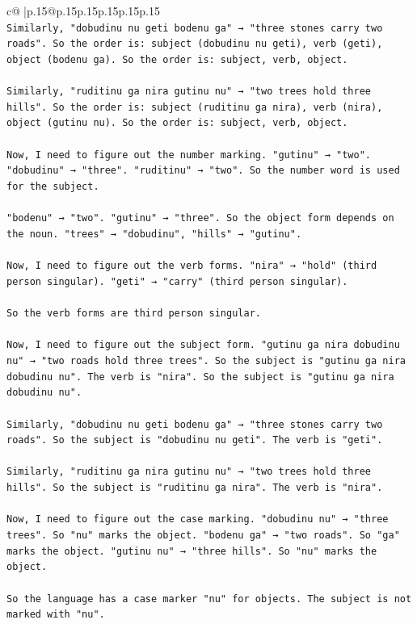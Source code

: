 \documentclass{article}
\begin{document}
{\begin{supertabular}{c@{$\;$}|p{.15\linewidth}@{}p{.15\linewidth}p{.15\linewidth}p{.15\linewidth}p{.15\linewidth}p{.15\linewidth}}
{{{\\ 
\texttt{Similarly, "dobudinu nu geti bodenu ga" → "three stones carry two roads". So the order is: subject (dobudinu nu geti), verb (geti), object (bodenu ga). So the order is: subject, verb, object.} \\
\\ 
\texttt{Similarly, "ruditinu ga nira gutinu nu" → "two trees hold three hills". So the order is: subject (ruditinu ga nira), verb (nira), object (gutinu nu). So the order is: subject, verb, object.} \\
\\ 
\texttt{Now, I need to figure out the number marking. "gutinu" → "two". "dobudinu" → "three". "ruditinu" → "two". So the number word is used for the subject.} \\
\\ 
\texttt{"bodenu" → "two". "gutinu" → "three". So the object form depends on the noun. "trees" → "dobudinu", "hills" → "gutinu".} \\
\\ 
\texttt{Now, I need to figure out the verb forms. "nira" → "hold" (third person singular). "geti" → "carry" (third person singular).} \\
\\ 
\texttt{So the verb forms are third person singular.} \\
\\ 
\texttt{Now, I need to figure out the subject form. "gutinu ga nira dobudinu nu" → "two roads hold three trees". So the subject is "gutinu ga nira dobudinu nu". The verb is "nira". So the subject is "gutinu ga nira dobudinu nu".} \\
\\ 
\texttt{Similarly, "dobudinu nu geti bodenu ga" → "three stones carry two roads". So the subject is "dobudinu nu geti". The verb is "geti".} \\
\\ 
\texttt{Similarly, "ruditinu ga nira gutinu nu" → "two trees hold three hills". So the subject is "ruditinu ga nira". The verb is "nira".} \\
\\ 
\texttt{Now, I need to figure out the case marking. "dobudinu nu" → "three trees". So "nu" marks the object. "bodenu ga" → "two roads". So "ga" marks the object. "gutinu nu" → "three hills". So "nu" marks the object.} \\
\\ 
\texttt{So the language has a case marker "nu" for objects. The subject is not marked with "nu".} \\
}}}
\end{supertabular}}
\end{document}
